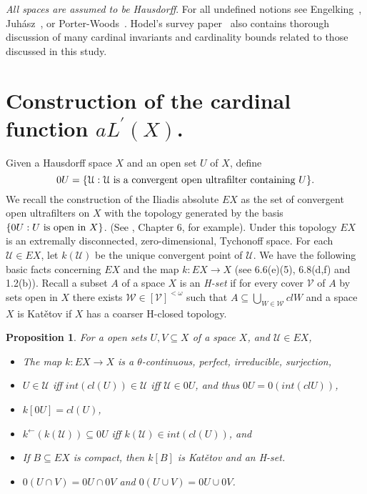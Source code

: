 \documentclass[11pt]{amsart}
\newif\ifdraft\draftfalse
\newtheorem{proposition}[theorem]{Proposition}
\theoremstyle{definition}
\theoremstyle{remark}
\numberwithin{equation}{section}
\begin{document}
\emph{All spaces are assumed to be Hausdorff}. For all undefined notions see Engelking~\cite{Engelking},  {Juh{\'a}sz}~\cite{Juh}, or Porter-Woods~\cite{PW}. Hodel's survey paper~\cite{Hodel2006} also contains thorough discussion of many cardinal invariants and cardinality bounds related to those discussed in this study. 

\section{Construction of the cardinal function $aL^\prime(X)$.}
Given a Hausdorff space $X$ and an open set $U$ of $X$, define 
$$0U=\{{\ensuremath{\mathcal{{U}}}}:{\ensuremath{\mathcal{{U}}}}\textup{ is a convergent open ultrafilter containing }U\}.$$
We recall the construction of the Iliadis absolute $EX$ as the set of convergent open ultrafilters on $X$ with the topology generated by the basis $\{0U: U\textup{ is open in }X\}$. (See \cite{PW}, Chapter 6, for example). Under this topology $EX$ is an extremally disconnected, zero-dimensional, Tychonoff space. For each ${\ensuremath{\mathcal{{U}}}}\in EX$, let $k({\ensuremath{\mathcal{{U}}}})$ be the unique convergent point of ${\ensuremath{\mathcal{{U}}}}$.  We have the following basic facts concerning $EX$ and the map $k:EX\to X$ (see \cite{PW} 6.6(e)(5), 6.8(d,f) and \cite{PV} 1.2(b)). Recall a subset $A$ of a space $X$ is an \emph{H-set} if for every cover ${\ensuremath{\mathcal{{V}}}}$ of $A$ by sets open in $X$ there exists ${\ensuremath{\mathcal{{W}}}}\in[{\ensuremath{\mathcal{{V}}}}]^{<\omega}$ such that $A{\subseteq}{\bigcup}_{W\in{\ensuremath{\mathcal{{W}}}}}clW$ and a space $X$ is Kat\v etov if $X$ has a coarser H-closed topology.

\begin{proposition}{{\immediate{}}{\ifdraft\hspace{-\lastskip}\vadjust{\vspace{-1mm}\smash{\llap{{\tt {{ex}}}\hspace{8mm}}}\vspace{1mm}}\fi}}
For a open sets $U,V{\subseteq} X$ of a space $X$, and ${\ensuremath{\mathcal{{U}}}}\in EX$,
\begin{itemize}
\item[(a)] The map $k:EX\to X$ is a $\theta$-continuous, perfect, irreducible, surjection,
\item[(b)] $U \in {\ensuremath{\mathcal{U}}}$ iff $int(cl(U)) \in {\ensuremath{\mathcal{U}}}$ iff ${\ensuremath{\mathcal{U}}} \in 0U$, and thus $0U=0(int(clU))$,
\item[(c)] $k[0U] = cl(U)$,
\item[(d)] $k^{\leftarrow}(k({\ensuremath{\mathcal{U}}})) \subseteq 0U$ iff $k({\ensuremath{\mathcal{U}}}) \in int(cl(U))$, and
\item[(e)] If $B \subseteq EX$ is compact, then $k[B]$ is Kat\v etov and  an H-set.
\item[(f)] $0(U{\cap} V)=0U{\cap} 0V$ and $0(U{\cup} V)=0U{\cup}0V$.
\end{itemize}
\end{proposition}
\end{document}
